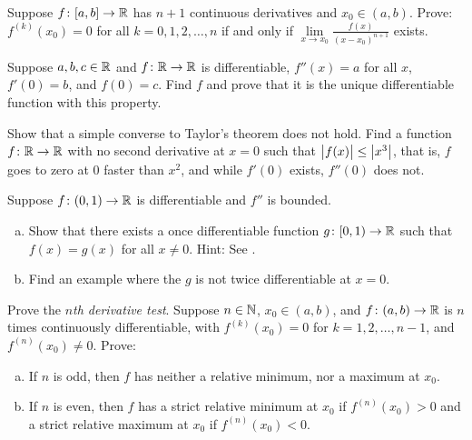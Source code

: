 \begin{exercise}
Suppose $f \colon [a,b] \to {\mathbb{R}}$ has $n+1$ continuous derivatives
and $x_0 \in (a,b)$.
Prove: $f^{(k)}(x_0) = 0$ for all $k = 0, 1, 2, \ldots, n$
if and only if $\lim\limits_{x\to x_0} \frac{f(x)}{{(x-x_0)}^{n+1}}$ exists.
\end{exercise}

\begin{exercise}
Suppose $a,b,c \in {\mathbb{R}}$ and $f \colon {\mathbb{R}} \to {\mathbb{R}}$ is differentiable,
$f''(x) = a$ for all $x$, $f'(0) = b$, and $f(0) = c$.  Find $f$ and prove that 
it is the unique differentiable function with this property.
\end{exercise}

\begin{exercise}[Challenging]
Show that a simple converse to Taylor's theorem does not hold.
Find a function $f \colon {\mathbb{R}} \to {\mathbb{R}}$ with no second derivative at $x=0$ such that
$\bigl\lvert {f(x)} \bigr\rvert \leq \bigl\lvert {x^3} \bigr\rvert$, that is, $f$ goes to zero at 0 faster than $x^2$, and
while $f'(0)$ exists, $f''(0)$ does not.
\end{exercise}

\begin{exercise} \label{exercise:extendboundedder2}
Suppose $f \colon (0,1) \to {\mathbb{R}}$ is differentiable and $f''$
is bounded.
\begin{enumerate}[a)]
\item
Show that there exists a once differentiable function $g \colon [0,1) \to {\mathbb{R}}$
such that $f(x) = g(x)$ for all $x \not= 0$.  Hint: 
See
.
\item
Find an example where the $g$ is not twice differentiable at $x=0$.
\end{enumerate}
\end{exercise}

\begin{exercise}
Prove the
\emph{$n$th derivative test}.
Suppose $n \in {\mathbb{N}}$,
$x_0 \in (a,b)$, and $f \colon (a,b) \to {\mathbb{R}}$ is $n$ times continuously
differentiable, with $f^{(k)}(x_0) = 0$ for $k=1,2,\ldots,n-1$, and
$f^{(n)}(x_0)
\not= 0$.
Prove:
\begin{enumerate}[a)]
\item
If $n$ is odd, then $f$ has neither a relative minimum,
nor a maximum at $x_0$.
\item
If $n$ is even, then $f$ has a strict relative minimum at $x_0$ if
$f^{(n)}(x_0) > 0$
and a strict relative maximum at $x_0$ if $f^{(n)}(x_0) < 0$.
\end{enumerate}
\end{exercise}

